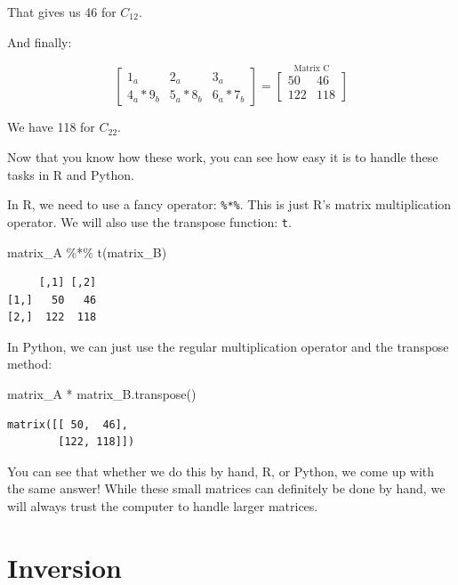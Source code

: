 \documentclass[
  letterpaper,
]{krantz}
\newenvironment{Shaded}{}{}
\newcommand{\FunctionTok}[1]{\textcolor[rgb]{0.02,0.16,0.49}{#1}}
\newcommand{\NormalTok}[1]{#1}
\newcommand{\OperatorTok}[1]{\textcolor[rgb]{0.40,0.40,0.40}{#1}}
\newcommand{\SpecialCharTok}[1]{\textcolor[rgb]{0.25,0.44,0.63}{#1}}
\begin{document}
That gives us 46 for \(C_{12}\).

And finally:

\[
\begin{bmatrix}
1_{a} & 2_{a} & 3_{a}\\
4_{a}*9_{b} & 5_{a}*8_{b} & 6_{a}*7_{b}
\end{bmatrix}
=
\stackrel{\mbox{Matrix C}}{
\begin{bmatrix}
50 & 46\\
122 & 118
\end{bmatrix}
}
\]

We have 118 for \(C_{22}\).

Now that you know how these work, you can see how easy it is to handle
these tasks in R and Python.

In R, we need to use a fancy operator: \texttt{\%*\%}. This is just R's
matrix multiplication operator. We will also use the transpose function:
\texttt{t}.

\begin{Shaded}
\begin{Highlighting}[]
\NormalTok{matrix\_A }\SpecialCharTok{\%*\%} \FunctionTok{t}\NormalTok{(matrix\_B)}
\end{Highlighting}
\end{Shaded}

\begin{verbatim}
     [,1] [,2]
[1,]   50   46
[2,]  122  118
\end{verbatim}

In Python, we can just use the regular multiplication operator and the
transpose method:

\begin{Shaded}
\begin{Highlighting}[]
\NormalTok{matrix\_A }\OperatorTok{*}\NormalTok{ matrix\_B.transpose()}
\end{Highlighting}
\end{Shaded}

\begin{verbatim}
matrix([[ 50,  46],
        [122, 118]])
\end{verbatim}

You can see that whether we do this by hand, R, or Python, we come up
with the same answer! While these small matrices can definitely be done
by hand, we will always trust the computer to handle larger matrices.

\section{Inversion}\label{inversion}
\end{document}
